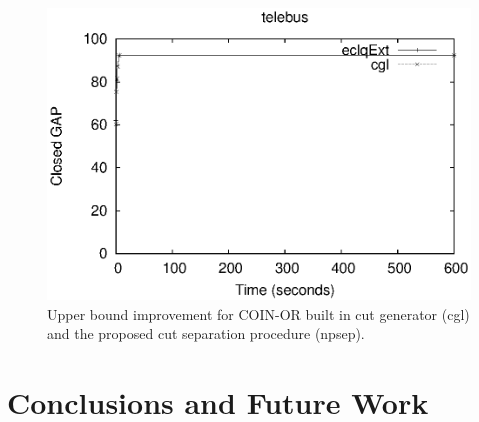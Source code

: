 \documentclass{endm}
\begin{document}
\begin{figure}
\begin{minipage}[h]{.5\textwidth}
\begin{center}
			\includegraphics[width=1.\textwidth]{telebus.eps}
		\end{center}
	\end{minipage}
	\caption{Upper bound improvement for COIN-OR built in cut generator (cgl) and the proposed cut separation procedure (npsep).}
	\label{figExperiments}
\end{figure}



\section{Conclusions and Future Work}\label{conclusions}



\end{document}

